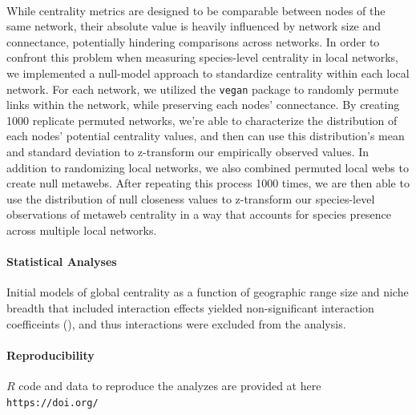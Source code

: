 \documentclass[12pt]{article}
\begin{document}
\paragraph*{} While centrality metrics are designed to be comparable between nodes of the same network, their absolute value is heavily influenced by network size and connectance, potentially hindering comparisons across networks. In order to confront this problem when measuring species-level centrality in local networks, we implemented a null-model approach to standardize centrality within each local network. For each network, we utilized the \texttt{vegan} package to randomly permute links within the network, while preserving each nodes' connectance. By creating 1000 replicate permuted networks, we're able to characterize the distribution of each nodes' potential centrality values, and then can use this distribution's mean and standard deviation to z-transform our empirically observed values. In addition to randomizing local networks, we also combined permuted local webs to create null metawebs. After repeating this process 1000 times, we are then able to use the distribution of null closeness values to z-transform our species-level observations of metaweb centrality in a way that accounts for species presence across multiple local networks. 

\paragraph*{Statistical Analyses}
Initial models of global centrality as a function of geographic range size and niche breadth that included interaction effects yielded non-significant interaction coefficeints (), and thus interactions were excluded from the analysis. 





\paragraph*{Reproducibility}
$R$ code and data to reproduce the analyzes are provided at here \\
\texttt{https://doi.org/}
\end{document}
